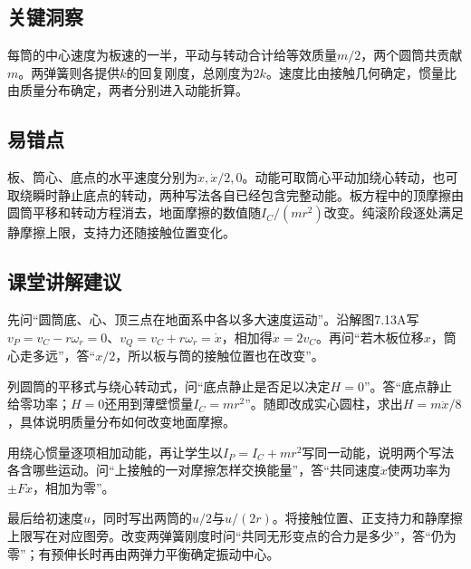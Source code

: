 \documentclass[UTF8,fontset=fandol,a4paper,11pt]{ctexart}
\begin{document}


\subsection*{关键洞察}

每筒的中心速度为板速的一半，平动与转动合计给等效质量$m/2$，两个圆筒共贡献$m$。两弹簧则各提供$k$的回复刚度，总刚度为$2k$。速度比由接触几何确定，惯量比由质量分布确定，两者分别进入动能折算。




\subsection*{易错点}

板、筒心、底点的水平速度分别为$\dot x,\dot x/2,0$。动能可取筒心平动加绕心转动，也可取绕瞬时静止底点的转动，两种写法各自已经包含完整动能。板方程中的顶摩擦由圆筒平移和转动方程消去，地面摩擦的数值随$I_C/(mr^2)$改变。纯滚阶段逐处满足静摩擦上限，支持力还随接触位置变化。




\subsection*{课堂讲解建议}

先问“圆筒底、心、顶三点在地面系中各以多大速度运动”。沿解图7.13A写$v_P=v_C-r\omega_r=0$、$v_Q=v_C+r\omega_r=\dot x$，相加得$\dot x=2v_C$。再问“若木板位移$x$，筒心走多远”，答“$x/2$，所以板与筒的接触位置也在改变”。

列圆筒的平移式与绕心转动式，问“底点静止是否足以决定$H=0$”。答“底点静止给零功率；$H=0$还用到薄壁惯量$I_C=mr^2$”。随即改成实心圆柱，求出$H=m\ddot x/8$，具体说明质量分布如何改变地面摩擦。

用绕心惯量逐项相加动能，再让学生以$I_P=I_C+mr^2$写同一动能，说明两个写法各含哪些运动。问“上接触的一对摩擦怎样交换能量”，答“共同速度$\dot x$使两功率为$\pm F\dot x$，相加为零”。

最后给初速度$u$，同时写出两筒的$u/2$与$u/(2r)$。将接触位置、正支持力和静摩擦上限写在对应图旁。改变两弹簧刚度时问“共同无形变点的合力是多少”，答“仍为零”；有预伸长时再由两弹力平衡确定振动中心。


\end{document}
